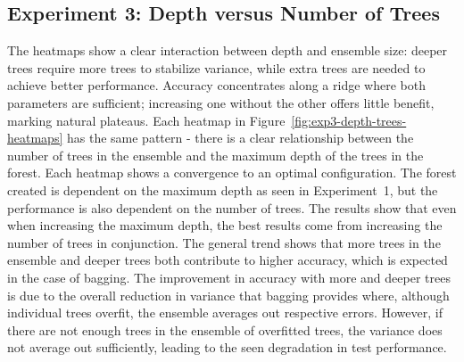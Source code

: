 \documentclass[conference]{IEEEtran}
\begin{document}
\subsection{Experiment 3: Depth versus Number of Trees}
The heatmaps show a clear interaction between depth and ensemble size: deeper trees require more trees to stabilize variance, while extra trees are needed to achieve better performance. Accuracy concentrates along a ridge where both parameters are sufficient; increasing one without the other offers little benefit, marking natural plateaus. Each heatmap in Figure~\ref{fig:exp3-depth-trees-heatmaps} has the same pattern - there is a clear relationship between the number of trees in the ensemble and the maximum depth of the trees in the forest. Each heatmap shows a convergence to an optimal configuration. The forest created is dependent on the maximum depth as seen in Experiment~1, but the performance is also dependent on the number of trees. The results show that even when increasing the maximum depth, the best results come from increasing the number of trees in conjunction. The general trend shows that more trees in the ensemble and deeper trees both contribute to higher accuracy, which is expected in the case of bagging. The improvement in accuracy with more and deeper trees is due to the overall reduction in variance that bagging provides where, although individual trees overfit, the ensemble averages out respective errors. However, if there are not enough trees in the ensemble of overfitted trees, the variance does not average out sufficiently, leading to the seen degradation in test performance.
\end{document}
